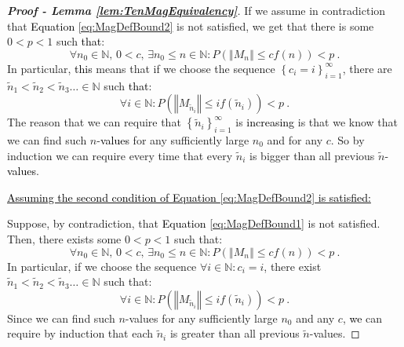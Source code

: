 \documentclass{article} %
\begin{document}
\begin{proof}[\textbf{Proof - Lemma \ref{lem:TenMagEquivalency}}]
If we assume in contradiction that \textcolor{black}{Equation} \ref{eq:MagDefBound2} is not satisfied, we get that there is some \(0<p<1\) such \textcolor{black}{that}:
\begin{equation}
\forall n_{0}\in\mathbb{N},\,0<c,\,\exists n_{0}\leq n\in\mathbb{N}:P\left(\left\Vert M_n\right\Vert \leq cf\left(n\right)\right)<p \ .
\end{equation}
In particular, \textcolor{black}{this} means that if we choose the sequence \(\left\{ c_{i}=i\right\} _{i=1}^{\infty}\), there are \(\tilde{n}_1<\tilde{n}_2<\tilde{n}_3\ldots\in\mathbb{N}\) such \textcolor{black}{that}:
\begin{equation}
    \forall i\in\mathbb{N}:P\left(\left\Vert M_{\tilde{n}_{i}}\right\Vert \leq if\left(\tilde{n}_{i}\right)\right)<p \ .
    \label{eq:Zin:Flin1}
\end{equation}
The reason that we can require that \(\left\{ \tilde{n}_{i}\right\} _{i=1}^{\infty}\) is \textcolor{black}{increasing} is that we know that we can find such \(n\)-\textcolor{black}{values} for any sufficiently large \(n_0\) and for any \(c\). So by induction we can require every time that every \(\tilde{n}_i\) is bigger than all previous \(\tilde{n}\)-\textcolor{black}{values}.

\underline{\textcolor{black}{Assuming the second condition of Equation \ref{eq:MagDefBound2} is satisfied:}}

Suppose, by contradiction, that \textcolor{black}{Equation} \ref{eq:MagDefBound1} is not satisfied. Then, there exists some \(0 < p < 1\) such that:
\begin{equation}
\forall n_0 \in \mathbb{N},\, 0 < c,\, \exists n_0 \leq n \in \mathbb{N}: P\left(\left\Vert M_n\right\Vert \leq cf\left(n\right)\right) < p \ .
\end{equation}
In particular, if we choose the sequence \(\forall i \in \mathbb{N}: c_i = i\), there exist \(\tilde{n}_1 < \tilde{n}_2 < \tilde{n}_3 \dots \in \mathbb{N}\) such that:
\begin{equation}
\forall i \in \mathbb{N}: P\left(\left\Vert M_{\tilde{n}_i}\right\Vert \leq if\left(\tilde{n}_i\right)\right) < p \ .
\end{equation}
Since we can find such \(n\)-values for any sufficiently large \(n_0\) and any \(c\), \textcolor{black}{we} can require by induction that each \(\tilde{n}_i\) is greater than all previous \(\tilde{n}\)-values. 


\end{proof}
\end{document}
